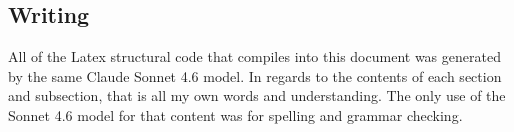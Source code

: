 \documentclass[conference]{IEEEtran}
\begin{document}
\subsection{Writing}
All of the Latex structural code that compiles into this document was generated by the same Claude Sonnet 4.6 model. In regards to the contents of each section and subsection, that is all my own words and understanding. The only use of the Sonnet 4.6 model for that content was for spelling and grammar checking.
\end{document}
